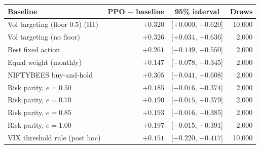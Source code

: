 \begin{tabular}{lrcr}
\toprule
Baseline & PPO $-$ baseline & 95\% interval & Draws \\
\midrule
Vol targeting (floor 0.5) (H1) & $+0.320$ & [$+0.000$, $+0.620$] & 10{,}000 \\
Vol targeting (no floor) & $+0.326$ & [$+0.034$, $+0.636$] & 2{,}000 \\
Best fixed action & $+0.261$ & [$-0.149$, $+0.550$] & 2{,}000 \\
Equal weight (monthly) & $+0.147$ & [$-0.078$, $+0.345$] & 2{,}000 \\
NIFTYBEES buy-and-hold & $+0.305$ & [$-0.041$, $+0.608$] & 2{,}000 \\
Risk parity, $e=0.50$ & $+0.185$ & [$-0.016$, $+0.374$] & 2{,}000 \\
Risk parity, $e=0.70$ & $+0.190$ & [$-0.015$, $+0.379$] & 2{,}000 \\
Risk parity, $e=0.85$ & $+0.193$ & [$-0.016$, $+0.385$] & 2{,}000 \\
Risk parity, $e=1.00$ & $+0.197$ & [$-0.015$, $+0.391$] & 2{,}000 \\
VIX threshold rule (post hoc) & $+0.151$ & [$-0.220$, $+0.417$] & 10{,}000 \\
\bottomrule
\end{tabular}

